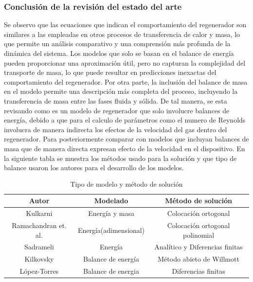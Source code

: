 \documentclass[12pt,letterpaper,final]{article}%
\begin{document}
\subsubsection{Conclusión de la revisión del estado del arte}

Se observo que las ecuaciones que indican el comportamiento del regenerador son similares a las empleadas en otros procesos de transferencia de calor y masa\cite{Kilkovsky2020}\cite{Kulkarni1992}\cite{SADRAMELI2016}, lo que permite un análisis comparativo y una comprensión más profunda de la dinámica del sistema.
Los modelos que solo se basan en el balance de energía pueden proporcionar una aproximación útil, pero no capturan la complejidad del transporte de masa, lo que puede resultar en predicciones inexactas del comportamiento del regenerador. 
\newline 
Por otra parte, la inclusión del balance de masa en el modelo permite una descripción más completa del proceso, incluyendo la transferencia de masa entre las fases fluida y sólida\cite{Ramachadran1984}. De tal manera, se esta revisando como es un modelo de regenerador que solo involucre balances de energía, debido a que para el calculo de parámetros como el numero de Reynolds involucra de manera indirecta los efectos de la velocidad del gas dentro del regenerador. Para posteriormente comparar con modelos que incluyan balances de masa que de manera directa expresan efecto de la velocidad en el dispositivo.
\newline
En la siguiente tabla se muestra los métodos usado para la solución y que tipo de balance usaron los autores para el desarrollo de los modelos.
\begin{table}[ht]
	\caption{Tipo de modelo y método de solución}
	\begin{center}
		\begin{tabular}{|c|c|c|}
			\hline
			Autor& Modelado & Método de solución\\ \hline
			Kulkarni\cite{Kulkarni1992}& Energía y masa& Colocación ortogonal \\ 
			Ramachandran et. al. \cite{Ramachadran1984} & Energía(adimensional) &Colocación ortogonal polinomial \\
			Sadrameli & Energía & Analítico y Diferencias finitas \\
			Kilkovsky & Balance de energía & Método abieto de Willmott   \\
			López-Torres & Balance de energia & Diferencias finitas \\
			
			\hline
			
			
		\end{tabular}
	\end{center}
\end{table}
\end{document}
